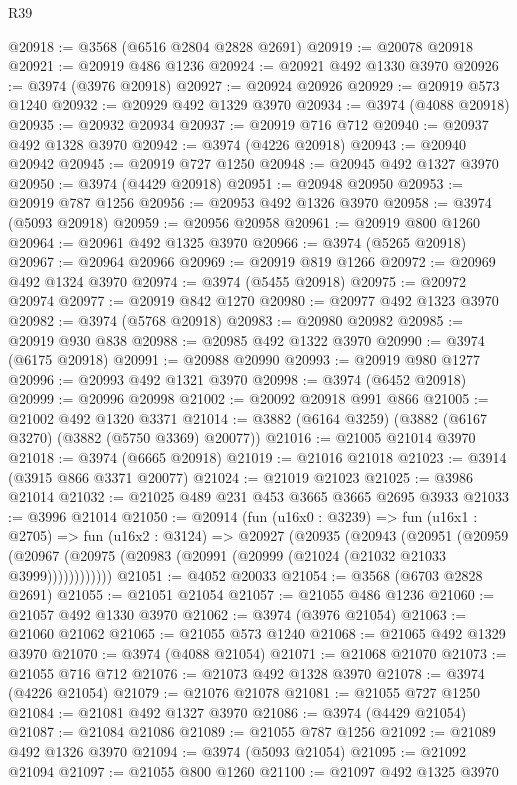 \begin{lexlean}{R39}
\begin{coremodule}
@20918 := @3568 (@6516 @2804 @2828 @2691)
@20919 := @20078 @20918
@20921 := @20919 @486 @1236
@20924 := @20921 @492 @1330 @3970
@20926 := @3974 (@3976 @20918)
@20927 := @20924 @20926
@20929 := @20919 @573 @1240
@20932 := @20929 @492 @1329 @3970
@20934 := @3974 (@4088 @20918)
@20935 := @20932 @20934
@20937 := @20919 @716 @712
@20940 := @20937 @492 @1328 @3970
@20942 := @3974 (@4226 @20918)
@20943 := @20940 @20942
@20945 := @20919 @727 @1250
@20948 := @20945 @492 @1327 @3970
@20950 := @3974 (@4429 @20918)
@20951 := @20948 @20950
@20953 := @20919 @787 @1256
@20956 := @20953 @492 @1326 @3970
@20958 := @3974 (@5093 @20918)
@20959 := @20956 @20958
@20961 := @20919 @800 @1260
@20964 := @20961 @492 @1325 @3970
@20966 := @3974 (@5265 @20918)
@20967 := @20964 @20966
@20969 := @20919 @819 @1266
@20972 := @20969 @492 @1324 @3970
@20974 := @3974 (@5455 @20918)
@20975 := @20972 @20974
@20977 := @20919 @842 @1270
@20980 := @20977 @492 @1323 @3970
@20982 := @3974 (@5768 @20918)
@20983 := @20980 @20982
@20985 := @20919 @930 @838
@20988 := @20985 @492 @1322 @3970
@20990 := @3974 (@6175 @20918)
@20991 := @20988 @20990
@20993 := @20919 @980 @1277
@20996 := @20993 @492 @1321 @3970
@20998 := @3974 (@6452 @20918)
@20999 := @20996 @20998
@21002 := @20092 @20918 @991 @866
@21005 := @21002 @492 @1320 @3371
@21014 := @3882 (@6164 @3259) (@3882 (@6167 @3270) (@3882 (@5750 @3369) @20077))
@21016 := @21005 @21014 @3970
@21018 := @3974 (@6665 @20918)
@21019 := @21016 @21018
@21023 := @3914 (@3915 @866 @3371 @20077)
@21024 := @21019 @21023
@21025 := @3986 @21014
@21032 := @21025 @489 @231 @453 @3665 @3665 @2695 @3933
@21033 := @3996 @21014
@21050 := @20914
    (fun (u16x0 : @3239) =>
    fun (u16x1 : @2705) =>
    fun (u16x2 : @3124) =>
    @20927
      (@20935
        (@20943
          (@20951
            (@20959 (@20967 (@20975 (@20983 (@20991 (@20999 (@21024 (@21032 @21033 @3999))))))))))))
@21051 := @4052 @20033
@21054 := @3568 (@6703 @2828 @2691)
@21055 := @21051 @21054
@21057 := @21055 @486 @1236
@21060 := @21057 @492 @1330 @3970
@21062 := @3974 (@3976 @21054)
@21063 := @21060 @21062
@21065 := @21055 @573 @1240
@21068 := @21065 @492 @1329 @3970
@21070 := @3974 (@4088 @21054)
@21071 := @21068 @21070
@21073 := @21055 @716 @712
@21076 := @21073 @492 @1328 @3970
@21078 := @3974 (@4226 @21054)
@21079 := @21076 @21078
@21081 := @21055 @727 @1250
@21084 := @21081 @492 @1327 @3970
@21086 := @3974 (@4429 @21054)
@21087 := @21084 @21086
@21089 := @21055 @787 @1256
@21092 := @21089 @492 @1326 @3970
@21094 := @3974 (@5093 @21054)
@21095 := @21092 @21094
@21097 := @21055 @800 @1260
@21100 := @21097 @492 @1325 @3970

\end{coremodule}
\end{lexlean}
